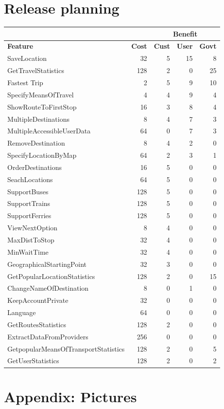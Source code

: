 \documentclass[a4paper]{article}
\begin{document}
	\section{Release planning}
		\begin{table}[h]
			\begin{tabular}{|l|r|r|r|r|} \hline
				\multicolumn{2}{|l|}{}	& \multicolumn{3}{c|}{\textbf{Benefit}} \\ \hline
				\textbf{Feature} & \textbf{Cost} & \textbf{Cust} & \textbf{User} & \textbf{Govt} \\ \hline
				SaveLocation	& 32 & 5 & 15 & 8 \\ 
				GetTravelStatistics	& 128 & 2 & 0 & 25 \\
				Fastest Trip	& 2 & 5 & 9 & 10 \\
				SpecifyMeansOfTravel	& 4 & 4	& 9 & 4 \\
				ShowRouteToFirstStop	& 16 & 3 & 8 & 4 \\
				MultipleDestinations	& 8 & 4 & 7 &3 \\
				MultipleAccessibleUserData	& 64 & 0 & 7 & 3 \\
				RemoveDestination	& 8 & 4 & 2 & 0 \\
				SpecifyLocationByMap	& 64 & 2 & 3 & 1 \\
				OrderDestinations	& 16 & 5 & 0 & 0 \\
				SeachLocations	& 64 &5 & 0 & 0 \\
				SupportBuses	& 128 & 5 & 0 & 0 \\
				SupportTrains	& 128 & 5 & 0 & 0 \\
				SupportFerries	& 128 & 5 & 0 & 0 \\
				ViewNextOption	& 8 & 4 & 0 & 0 \\
				MaxDistToStop	& 32 & 4 & 0 & 0 \\
				MinWaitTime	& 32 & 4 & 0 & 0 \\
				GeographicalStartingPoint	& 32 & 3 & 0 & 0 \\
				GetPopularLocationStatistics	& 128 & 2 & 0 & 15 \\ 
				ChangeNameOfDestination	& 8 & 0 & 1 & 0 \\
				KeepAccountPrivate	& 32 & 0 & 0 & 0 \\
				Language	& 64 & 0 & 0 & 0 \\
				GetRoutesStatistics	& 128 & 2 & 0 & 0 \\
				ExtractDataFromProviders	& 256 & 0 & 0 & 0 \\
				GetpopularMeansOfTransportStatistics	& 128 & 2 & 0 & 5 \\
				GetUserStatistics	& 128 & 2 & 0 & 2 \\ \hline
		\end{tabular}
	\end{table}

		
%		
%		
%		
				
	\section{Appendix: Pictures} %
		\label{sec:appendix}
		
\end{document}

